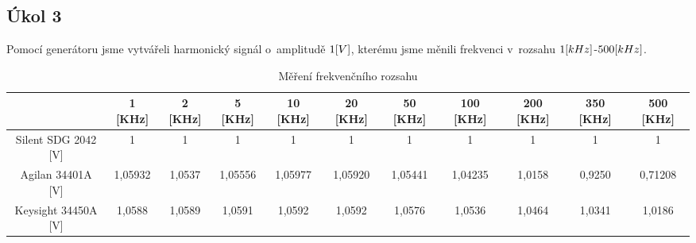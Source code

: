 \documentclass{article}
\begin{document}
\subsection{Úkol 3}
Pomocí generátoru jsme vytvářeli harmonický signál o~amplitudě \(1\-[V]\), kterému jsme měnili frekvenci v~rozsahu \(1\-[kHz]\)-\(500\-[kHz]\).\\ 
\begin{table}[H]
    \footnotesize
    \vspace{-6mm}
    \hspace{-8mm}
    \begin{tabular}{|c|c|c|c|c|c|c|c|c|c|c|}
    \hline
                        & 1 [KHz]  	& 2 [KHz]	& 5 [KHz]	& 10 [KHz]	& 20 [KHz]	& 50 [KHz]	& 100 [KHz]	& 200 [KHz]	& 350 [KHz]	& 500 [KHz] \\ \hline
    Silent SDG 2042 [V]	& 1	        & 1	        & 1      	& 1   	    & 1   	    & 1   	    & 1   	    & 1	        & 1   	    & 1         \\ \hline
    Agilan 34401A   [V]	& 1,05932	& 1,0537	& 1,05556	& 1,05977	& 1,05920	& 1,05441	& 1,04235	& 1,0158	& 0,9250	& 0,71208   \\ \hline
    Keysight 34450A [V]	& 1,0588	& 1,0589	& 1,0591	& 1,0592	& 1,0592	& 1,0576	& 1,0536	& 1,0464	& 1,0341	& 1,0186    \\ \hline
    \end{tabular}
    \caption{\label{frekvencni_rozsah} Měření frekvenčního rozsahu}
    \normalsize
\end{table}
\end{document}
